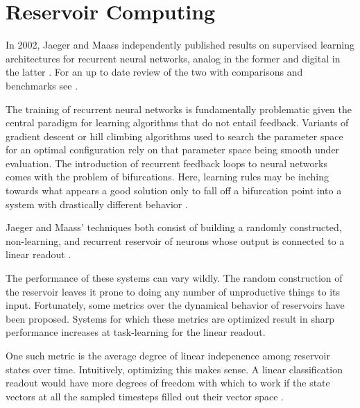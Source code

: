 \documentclass{elsart1p}
\begin{document}
\section{Reservoir Computing}
In 2002, Jaeger and Maass independently published results on supervised
learning architectures for recurrent neural networks, analog in the former
and digital in the latter \cite{jaeger_original, maass_original}.  For an
up to date review of the two with comparisons and benchmarks see \cite{verstraeten}.

The training of recurrent neural networks is fundamentally problematic given
the central paradigm for learning algorithms that do not entail feedback.
Variants of gradient descent or hill climbing algorithms used to search the parameter
space for an optimal configuration rely on that parameter space being smooth
under evaluation.  The introduction of recurrent feedback loops to neural networks comes with the problem of bifurcations.  Here, learning rules may be inching towards what appears a good solution only to fall off a bifurcation point into
a system with drastically different behavior \cite{doya}.

Jaeger and Maass' techniques both consist of building a randomly constructed,
non-learning, and recurrent reservoir of neurons whose output is 
connected to a linear readout \cite{maass_metaphor}.


The performance of these systems can vary wildly.  The random construction of
the reservoir leaves it prone to doing any number of unproductive things
to its input.  Fortunately, some metrics over the dynamical behavior of
reservoirs have been proposed.  Systems for which these metrics are optimized
result in sharp performance increases at task-learning for the linear readout.

One such metric is the average degree of linear 
indepenence among reservoir
states over time.  Intuitively, optimizing this makes sense.  
A linear classification
readout would have more degrees of freedom with which to work if the
state vectors at all the sampled timesteps filled out their vector space
\cite{maass_what_makes}.

\end{document}
